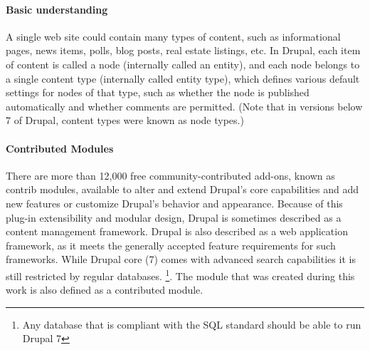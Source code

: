 \paragraph{Basic understanding}
A single web site could contain many types of content, such as informational pages, news items, polls, blog posts, real estate listings, etc. In Drupal, each item of content is called a node (internally called an entity), and each node belongs to a single content type (internally called entity type), which defines various default settings for nodes of that type, such as whether the node is published automatically and whether comments are permitted. (Note that in versions below 7 of Drupal, content types were known as node types.)

\paragraph{Contributed Modules}
There are more than 12,000 free community-contributed add-ons, known as contrib modules, available to alter and extend Drupal's core capabilities and add new features or customize Drupal's behavior and appearance. Because of this plug-in extensibility and modular design, Drupal is sometimes described as a content management framework. Drupal is also described as a web application framework, as it meets the generally accepted feature requirements for such frameworks.
While Drupal core (7) comes with advanced search capabilities it is still restricted by regular databases. \footnote{Any database that is compliant with the SQL standard should be able to run Drupal 7}. The module that was created during this work is also defined as a contributed module.


